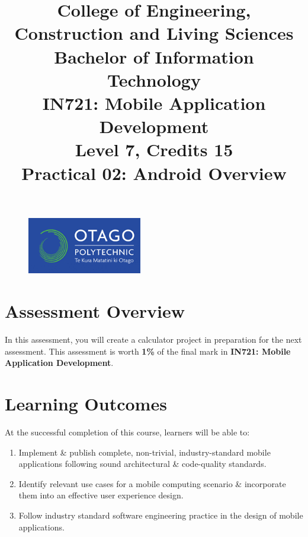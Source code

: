 \documentclass{article}
\author{}
\begin{document}
\begin{figure}
	\centering
	\includegraphics[width=50mm]{./img/logo.png}
\end{figure}

\title{College of Engineering, Construction and Living Sciences\\Bachelor of Information Technology\\IN721: Mobile Application Development\\Level 7, Credits 15\\\textbf{Practical 02: Android Overview}}
\date{}
\maketitle

\section*{Assessment Overview}
In this assessment, you will create a calculator project in preparation for the next assessment. This assessment is worth \textbf{1\%} of the final mark in \textbf{IN721: Mobile Application Development}.

\section*{Learning Outcomes}
At the successful completion of this course, learners will be able to:
\begin{enumerate}
	\item Implement \& publish complete, non-trivial, industry-standard mobile applications following sound architectural \& code-quality standards.
	\item Identify relevant use cases for a mobile computing scenario \& incorporate them into an effective user experience design.
	\item Follow industry standard software engineering practice in the design of mobile applications.
\end{enumerate}
\end{document}

